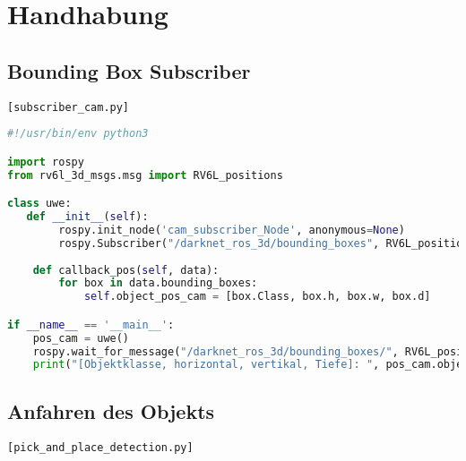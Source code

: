 \newpage\section{Handhabung} \label{sec:handhabung}

\subsection{Bounding Box Subscriber} \label{subsec:bounding_sub}

\lstinline{[subscriber_cam.py]}

\begin{lstlisting}[language=python]
#!/usr/bin/env python3

import rospy
from rv6l_3d_msgs.msg import RV6L_positions

class uwe:
   def __init__(self):
        rospy.init_node('cam_subscriber_Node', anonymous=None)
        rospy.Subscriber("/darknet_ros_3d/bounding_boxes", RV6L_positions, self.callback_pos)
        
    def callback_pos(self, data):
        for box in data.bounding_boxes:
            self.object_pos_cam = [box.Class, box.h, box.w, box.d]

if __name__ == '__main__':
    pos_cam = uwe()
    rospy.wait_for_message("/darknet_ros_3d/bounding_boxes/", RV6L_positions, timeout=None)
    print("[Objektklasse, horizontal, vertikal, Tiefe]: ", pos_cam.object_pos_cam)
\end{lstlisting}

\subsection{Anfahren des Objekts}

\lstinline{[pick_and_place_detection.py]} 

